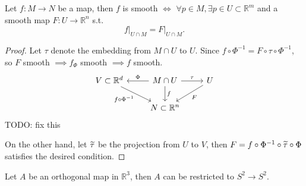 \begin{lemma}
	Let $f: M\to N$ be a map,
	then $f$ is smooth $\iff$ $\forall p\in M,
	\exists p\in U \subset \mathbb{R}^{m}$ and
	a smooth map $F: U\to \mathbb{R}^{n}$ s.t.
	\[
	f\big|_{U\cap M} = F\big|_{U\cap M}.
	\]
\end{lemma}
\begin{proof}[Proof]
    Let $\tau$ denote the embedding from $M\cap U$ to $U$.
	Since $f\circ \Phi^{-1} = F\circ \tau\circ \Phi^{-1}$,
	so $F$ smooth $ \implies f_\Phi$ smooth $ \implies f$ smooth.
	\begin{equation*}
	\begin{tikzcd}
		V \subset \mathbb{R}^{d}\drar["f\circ \Phi^{-1}"']
		& M\cap U\rar["\tau"]\lar["\Phi"']\dar["f"]
								& U\dlar["F"]\\
		& N \subset \mathbb{R}^{n}
	\end{tikzcd}
	\end{equation*}
	TODO: fix this

	On the other hand,
	let $\widetilde{\tau}$ be the projection from $U$ to $V$,
	then $F = f\circ \Phi^{-1}\circ \widetilde{\tau}\circ \Phi$ satisfies
	the desired condition.
\end{proof}

\begin{example}
    Let $A$ be an orthogonal map in $\mathbb{R}^{3}$,
	then $A$ can be restricted to $S^2 \to S^2$.
\end{example}

